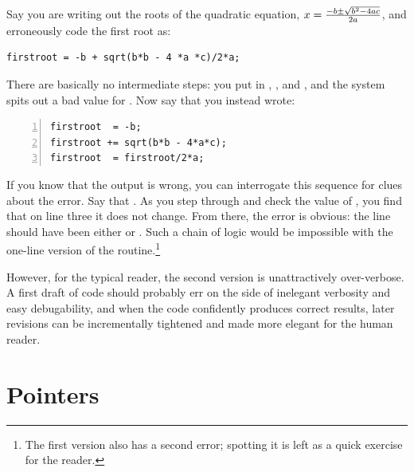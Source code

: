 Say you are writing out the roots of the quadratic equation, $x = {-b \pm \sqrt{b^2 -4ac}\over 2a}$, and erroneously code the first root as:
\begin{lstlisting}
firstroot = -b + sqrt(b*b - 4 *a *c)/2*a;
\end{lstlisting}
There are basically no intermediate steps: you put in , ,
and , and the system spits out a bad value for . Now say that you
instead wrote:
\begin{lstlisting}[numbers=left, numberstyle=\scshape]
firstroot  = -b;
firstroot += sqrt(b*b - 4*a*c);
firstroot  = firstroot/2*a;
\end{lstlisting}
If you know that the output is wrong, you can interrogate this
sequence for clues about the error. Say that . As you step through and check the value 
of , you find that on line three it does not change.
From there, the error is obvious: the line should have been either
 or .  Such a
chain of logic would be impossible with the one-line version of the
routine.\footnote{The first version also has a second error;
spotting it is left as a quick exercise for the reader.} 

However, for the typical reader, the second version is unattractively
over-verbose. A first draft of code should probably err on the side of
inelegant verbosity and easy debugability, and when the code confidently
produces correct results, later revisions can be incrementally tightened
and made more elegant for the human reader.



 \label{prepointers}\section{Pointers} \label{pointers} 

